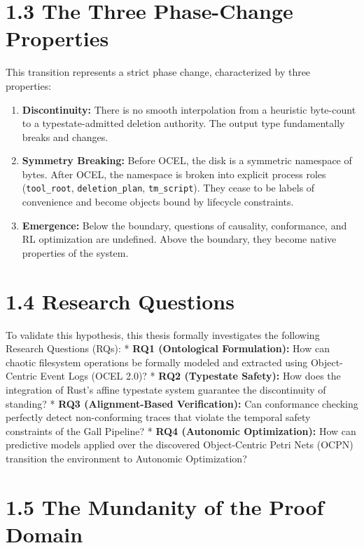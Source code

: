\documentclass[
  12pt,
]{report}
\providecommand{\tightlist}{%
  \setlength{\itemsep}{0pt}\setlength{\parskip}{0pt}}
\begin{document}
\section{1.3 The Three Phase-Change
Properties}\label{the-three-phase-change-properties}

This transition represents a strict phase change, characterized by three
properties:

\begin{enumerate}
\def\labelenumi{\arabic{enumi}.}
\tightlist
\item
  \textbf{Discontinuity:} There is no smooth interpolation from a
  heuristic byte-count to a typestate-admitted deletion authority. The
  output type fundamentally breaks and changes.
\item
  \textbf{Symmetry Breaking:} Before OCEL, the disk is a symmetric
  namespace of bytes. After OCEL, the namespace is broken into explicit
  process roles (\texttt{tool\_root}, \texttt{deletion\_plan},
  \texttt{tm\_script}). They cease to be labels of convenience and
  become objects bound by lifecycle constraints.
\item
  \textbf{Emergence:} Below the boundary, questions of causality,
  conformance, and RL optimization are undefined. Above the boundary,
  they become native properties of the system.
\end{enumerate}

\section{1.4 Research Questions}\label{research-questions}

To validate this hypothesis, this thesis formally investigates the
following Research Questions (RQs): * \textbf{RQ1 (Ontological
Formulation):} How can chaotic filesystem operations be formally modeled
and extracted using Object-Centric Event Logs (OCEL 2.0)? * \textbf{RQ2
(Typestate Safety):} How does the integration of Rust's affine typestate
system guarantee the discontinuity of standing? * \textbf{RQ3
(Alignment-Based Verification):} Can conformance checking perfectly
detect non-conforming traces that violate the temporal safety
constraints of the Gall Pipeline? * \textbf{RQ4 (Autonomic
Optimization):} How can predictive models applied over the discovered
Object-Centric Petri Nets (OCPN) transition the environment to Autonomic
Optimization?

\section{1.5 The Mundanity of the Proof
Domain}\label{the-mundanity-of-the-proof-domain}
\end{document}
